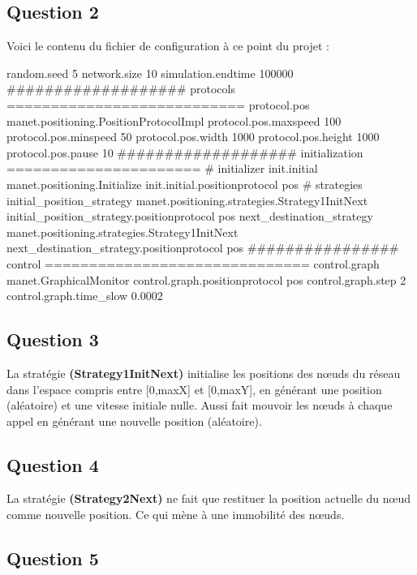\documentclass[10pt]{report}
\begin{document}
\subsection{Question 2}
Voici le contenu du fichier de configuration à ce point du projet :
\newline
\newline
\begin{boxedlisting}
random.seed 5
network.size 10
simulation.endtime 100000
################### protocols ===========================
protocol.pos manet.positioning.PositionProtocolImpl
protocol.pos.maxspeed 100
protocol.pos.minspeed 50
protocol.pos.width 1000
protocol.pos.height 1000
protocol.pos.pause 10
################### initialization ======================
# initializer
init.initial manet.positioning.Initialize
init.initial.positionprotocol pos
# strategies
initial_position_strategy manet.positioning.strategies.Strategy1InitNext
initial_position_strategy.positionprotocol pos
next_destination_strategy manet.positioning.strategies.Strategy1InitNext
next_destination_strategy.positionprotocol pos
################ control ==============================
control.graph manet.GraphicalMonitor
control.graph.positionprotocol pos
control.graph.step 2
control.graph.time_slow 0.0002
\end{boxedlisting}

\subsection{Question 3}
La stratégie \textbf{(Strategy1InitNext)} initialise les positions des nœuds du réseau dans l'espace compris entre [0,maxX] et [0,maxY], en générant une position (aléatoire) et une vitesse initiale nulle. Aussi fait mouvoir les nœuds à chaque appel en générant une nouvelle position (aléatoire).

\subsection{Question 4}
La stratégie \textbf{(Strategy2Next)} ne fait que restituer la position actuelle du nœud comme nouvelle position. Ce qui mène à une immobilité des nœuds.

\subsection{Question 5}
\end{document}
